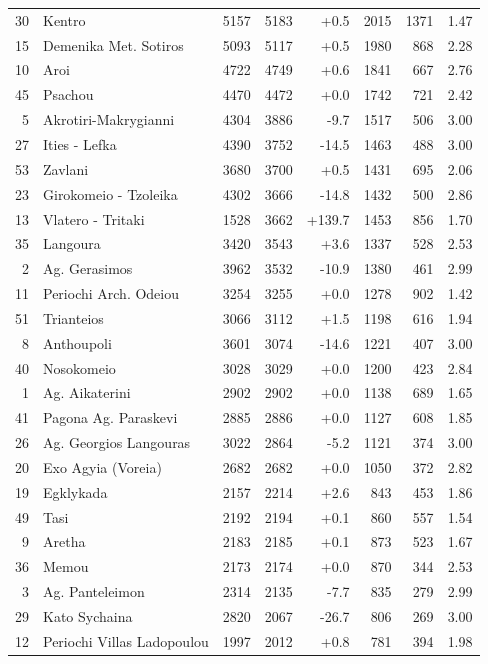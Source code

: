 \begin{scriptsize}
\begin{longtable}{rp{3.4cm}rrrrrr}
30 & Kentro & 5157 & 5183 & +0.5 & 2015 & 1371 & 1.47 \\
15 & Demenika Met. Sotiros & 5093 & 5117 & +0.5 & 1980 & 868 & 2.28 \\
10 & Aroi & 4722 & 4749 & +0.6 & 1841 & 667 & 2.76 \\
45 & Psachou & 4470 & 4472 & +0.0 & 1742 & 721 & 2.42 \\
5 & Akrotiri-Makrygianni & 4304 & 3886 & -9.7 & 1517 & 506 & 3.00 \\
27 & Ities - Lefka & 4390 & 3752 & -14.5 & 1463 & 488 & 3.00 \\
53 & Zavlani & 3680 & 3700 & +0.5 & 1431 & 695 & 2.06 \\
23 & Girokomeio - Tzoleika & 4302 & 3666 & -14.8 & 1432 & 500 & 2.86 \\
13 & Vlatero - Tritaki & 1528 & 3662 & +139.7 & 1453 & 856 & 1.70 \\
35 & Langoura & 3420 & 3543 & +3.6 & 1337 & 528 & 2.53 \\
2 & Ag. Gerasimos & 3962 & 3532 & -10.9 & 1380 & 461 & 2.99 \\
11 & Periochi Arch. Odeiou & 3254 & 3255 & +0.0 & 1278 & 902 & 1.42 \\
51 & Trianteios & 3066 & 3112 & +1.5 & 1198 & 616 & 1.94 \\
8 & Anthoupoli & 3601 & 3074 & -14.6 & 1221 & 407 & 3.00 \\
40 & Nosokomeio & 3028 & 3029 & +0.0 & 1200 & 423 & 2.84 \\
1 & Ag. Aikaterini & 2902 & 2902 & +0.0 & 1138 & 689 & 1.65 \\
41 & Pagona Ag. Paraskevi & 2885 & 2886 & +0.0 & 1127 & 608 & 1.85 \\
26 & Ag. Georgios Langouras & 3022 & 2864 & -5.2 & 1121 & 374 & 3.00 \\
20 & Exo Agyia (Voreia) & 2682 & 2682 & +0.0 & 1050 & 372 & 2.82 \\
19 & Egklykada & 2157 & 2214 & +2.6 & 843 & 453 & 1.86 \\
49 & Tasi & 2192 & 2194 & +0.1 & 860 & 557 & 1.54 \\
9 & Aretha & 2183 & 2185 & +0.1 & 873 & 523 & 1.67 \\
36 & Memou & 2173 & 2174 & +0.0 & 870 & 344 & 2.53 \\
3 & Ag. Panteleimon & 2314 & 2135 & -7.7 & 835 & 279 & 2.99 \\
29 & Kato Sychaina & 2820 & 2067 & -26.7 & 806 & 269 & 3.00 \\
12 & Periochi Villas Ladopoulou & 1997 & 2012 & +0.8 & 781 & 394 & 1.98 \\

\end{longtable}
\end{scriptsize}
